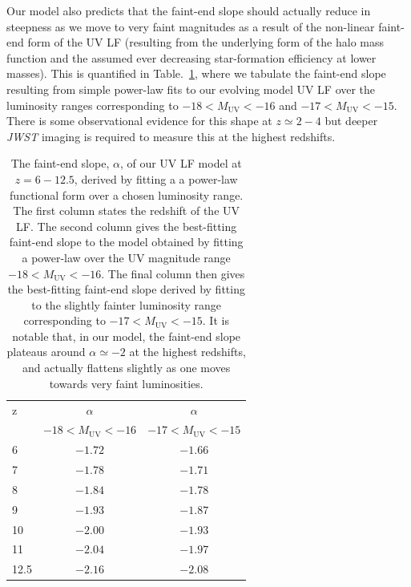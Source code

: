 \documentclass[fleqn,usenatbib]{mnras}
\begin{document}
Our model also predicts that the faint-end slope should actually reduce in steepness as we move to very faint magnitudes as a result of the non-linear faint-end form of the UV LF (resulting from the underlying form of the halo mass function and the assumed ever decreasing star-formation efficiency at lower masses). This is quantified in Table.~\ref{tab:faint_end}, where we tabulate the faint-end slope resulting from simple power-law fits to our evolving model UV LF over the luminosity ranges corresponding to  $-18<M_{\mathrm{UV}}<-16$ and $-17<M_{\mathrm{UV}}<-15$. There is some observational evidence for this shape at $z\simeq2-4$ \citep{parsa2016} but deeper \textit{JWST} imaging is required to measure this at the highest redshifts.
\begin{table}
	\centering
	\caption{The faint-end slope, $\alpha$, of our UV LF model at $z=6-12.5$, derived by fitting a a power-law functional form over a chosen luminosity range. The first column states the redshift of the UV LF. The second column gives the best-fitting faint-end slope to the model obtained by fitting a power-law over the UV magnitude range $-18<M_{\mathrm{UV}}<-16$. The final column then gives the best-fitting faint-end slope derived by fitting to the slightly fainter luminosity range corresponding to  $-17<M_{\mathrm{UV}}<-15$. It is notable that, in our model, the faint-end slope plateaus around $\alpha \simeq -2$ at the highest redshifts, and actually flattens slightly as one moves towards very faint luminosities.}
	\label{tab:faint_end}
    \setlength{\tabcolsep}{4pt} %
	\renewcommand{\arraystretch}{1.15} %
	\begin{tabular}{lcc} %
		\hline
          z & $\alpha$ & $\alpha$\\
		 & $-18<M_{\mathrm{UV}}<-16$  & $-17<M_{\mathrm{UV}}<-15$ \\
		\hline
  6 & $-1.72$ & $-1.66$\\
  7 & $-1.78$ & $-1.71$\\
  8 & $-1.84$ & $-1.78$\\
  9 & $-1.93$ & $-1.87$\\
  10 & $-2.00$ & $-1.93$\\
  11 & $-2.04$ & $-1.97$\\
  12.5 & $-2.16$ & $-2.08$\\
  \hline
	\end{tabular}
\end{table}
\end{document}
